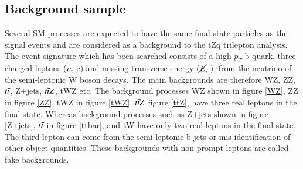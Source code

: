 \subsection{Background sample}
\label{subsec:bkg}

Several SM processes are expected to have the same final-state particles as the signal events and are considered as a background to the tZq trilepton analysis. The event signature which has been searched consists of a high $p_{T}$ b-quark, three-charged leptons ($\mu$, e) and missing transverse energy ($\cancel{E}_{T}$), from the neutrino of the semi-leptonic W boson decays. The main backgrounds are therefore WZ, ZZ, $t\Bar{t}$, Z+jets, $t\Bar{t}Z$, tWZ etc.  The background processes WZ shown in figure \ref{WZ}, ZZ in figure \ref{ZZ}, tWZ in figure \ref{tWZ}, $t\Bar{t}Z$ figure \ref{ttZ}, have three real leptons in the final state. Whereas background processes such as Z+jets shown in figure \ref{Z+jets}, $t\Bar{t}$ in figure \ref{ttbar}, and tW have only two real leptons in the final state. The third lepton can come from the semi-leptonic b-jets or mis-identification of other object quantities. These backgrounds with non-prompt leptons are called fake backgrounds.


